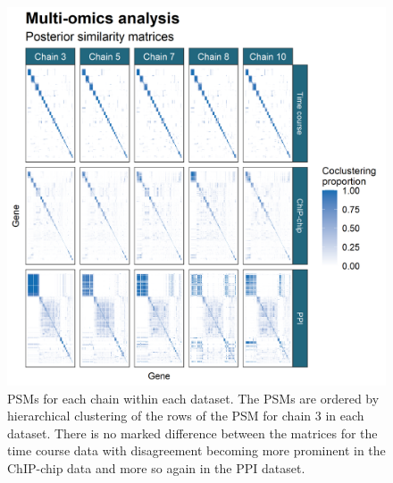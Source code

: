 \documentclass[]{article}
\begin{document}
\begin{figure}
	\centering
	\includegraphics[scale=1.0]{./Images/Yeast/YeastPSMcomparisonReduced.png}
	\caption{PSMs for each chain within each dataset. The PSMs are ordered by hierarchical clustering of the rows of the PSM for chain 3 in each dataset. There is no marked difference between the matrices for the time course  data with disagreement becoming more prominent in the ChIP-chip data and more so again in the PPI dataset.}
	\label{fig:yeastPSMs}
\end{figure}



\end{document}
